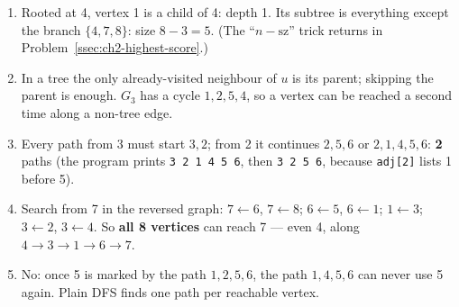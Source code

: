 \begin{solutionbox}[Answers]
\begin{enumerate}[leftmargin=*]
    \item Rooted at 4, vertex 1 is a child of 4: depth 1. Its subtree is everything except the branch $\{4, 7, 8\}$: size $8 - 3 = 5$. (The ``$n - \mathrm{sz}$'' trick returns in Problem~\ref{ssec:ch2-highest-score}.)
    \item In a tree the only already-visited neighbour of $u$ is its parent; skipping the parent is enough. $G_3$ has a cycle $1, 2, 5, 4$, so a vertex can be reached a second time along a non-tree edge.
    \item Every path from 3 must start $3, 2$; from 2 it continues $2, 5, 6$ or $2, 1, 4, 5, 6$: \textbf{2} paths (the program prints \texttt{3 2 1 4 5 6}, then \texttt{3 2 5 6}, because \texttt{adj[2]} lists 1 before 5).
    \item Search from 7 in the reversed graph: $7 \leftarrow 6$, $7 \leftarrow 8$; $6 \leftarrow 5$, $6 \leftarrow 1$; $1 \leftarrow 3$; $3 \leftarrow 2$, $3 \leftarrow 4$. So \textbf{all 8 vertices} can reach 7 --- even 4, along $4 \to 3 \to 1 \to 6 \to 7$.
    \item No: once 5 is marked by the path $1, 2, 5, 6$, the path $1, 4, 5, 6$ can never use 5 again. Plain DFS finds one path per reachable vertex.
\end{enumerate}
\end{solutionbox}
